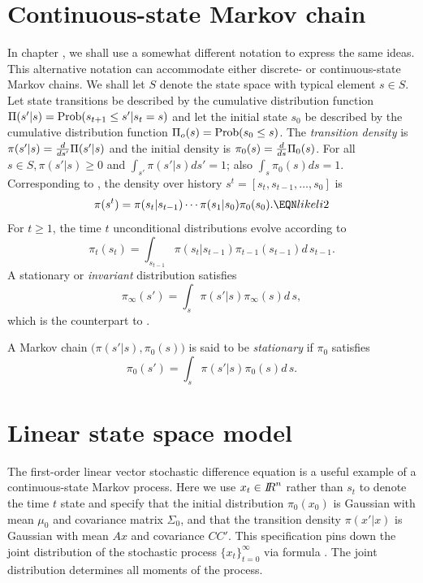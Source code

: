 \section{Continuous-state Markov chain}\label{sec:Markovcontstsp}%
In chapter , we shall  use a somewhat different
notation to express the same ideas. This alternative notation can
accommodate either discrete- or continuous-state Markov chains.  We
shall let $S$ denote the state space with typical element $s \in
S$.     Let state transitions be described by the cumulative distribution function
$\Pi(s' | s) =  {\rm
Prob} (s_{t+1} \leq  s' | s_t =s)$ and let the initial state $s_0$ be described by
 the cumulative distribution function $\Pi_o(s) =  {\rm
Prob} (s_0 \leq s)$.  The {\it transition density\/} is $\pi(s' | s )  =  {d \over d s'} \Pi(s'|s)$
and the initial density is %
$\pi_0(s) = {d \over d s} \Pi_0(s)$.  For all $s\in S, \pi(s'|s )
\geq 0$ and $  \int_{s'} \pi(s'|s) d s' =1$; also $\int_s \pi_0(s) d s
=1$.
Corresponding to , the  density
over  history $s^t = [s_t, s_{t-1}, \ldots, s_0]$
is
 $$ \pi(s^t) = \pi(s_t | s_{t-1} )\cdots \pi(s_1| s_0) \pi_0 (s_0).
  \EQN likeli2 $$
For $t\geq 1$, the time $t$ unconditional distributions
evolve according to
$$ \pi_t(s_t) = \int_{s_{t-1}} \pi(s_t|s_{t-1}) \pi_{t-1} (s_{t-1})
     d \, s_{t-1} .$$
A stationary or  {\it invariant\/} distribution
satisfies
$$ \pi_\infty(s') = \int_s \pi(s'|s) \pi_\infty (s) d \, s, $$
which is the counterpart to
.

\medskip
{} A Markov chain $\bigl(\pi(s'|s), \pi_0(s)\bigr)$ is said
to be {\it stationary\/} if $\pi_0$ satisfies
  $$ \pi_0(s') = \int_s \pi(s'|s) \pi_0 (s) d \, s. $$

%
\section{Linear state space model}\label{sec:stochlinear}%
   The first-order linear vector stochastic difference equation
is a  useful example of a continuous-state Markov process.
Here we  use
$x_t \in {{I\kern-0.3em R}}^n$   rather than $s_t$ to denote the time $t$ state
and
specify that the initial distribution   $\pi_0(x_0)$ is Gaussian with mean
$\mu_0$ and covariance matrix $\Sigma_0$, and that
the transition density $\pi(x'|x) $ is Gaussian with
mean $A x$ and covariance $C C'$.
This specification pins down the joint distribution of the
stochastic process $\{x_t\}_{t=0}^\infty$ via formula
.
The joint distribution determines
all  moments of the process.

